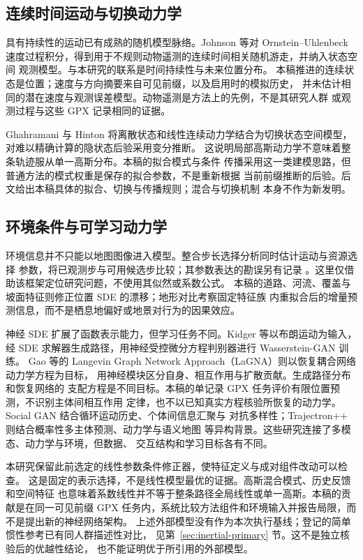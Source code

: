 \documentclass[UTF8,11pt]{ctexart}
\begin{document}
\subsection{连续时间运动与切换动力学}
具有持续性的运动已有成熟的随机模型脉络。Johnson 等对 Ornstein--Uhlenbeck
速度过程积分，得到用于不规则动物遥测的连续时间相关随机游走，并纳入状态空间
观测模型\cite{johnson2008}。与本研究的联系是时间持续性与未来位置分布。
本稿推进的连续状态是位置；速度与方向摘要来自可见前缀，以及启用时的模拟历史，
并未估计相同的潜在速度与观测误差模型。动物遥测是方法上的先例，不是其研究人群
或观测过程与这些 GPX 记录相同的证据。

Ghahramani 与 Hinton 将离散状态和线性连续动力学结合为切换状态空间模型，
对难以精确计算的隐状态后验采用变分推断\cite{ghahramani2000}。
这说明局部高斯动力学不意味着整条轨迹服从单一高斯分布。本稿的拟合模式与条件
传播采用这一类建模思路，但普通方法的模式权重是保存的拟合参数，不是重新根据
当前前缀推断的后验。后文给出本稿具体的拟合、切换与传播规则；混合与切换机制
本身不作为新发明。

\subsection{环境条件与可学习动力学}
环境信息并不只能以地图图像进入模型。整合步长选择分析同时估计运动与资源选择
参数，将已观测步与可用候选步比较\cite{avgar2016}；其参数表达的勘误另有记录
\cite{avgar2017correction}。这里仅借助该框架定位研究问题，不使用其似然或系数公式。
本稿的道路、河流、覆盖与坡面特征则修正位置 SDE 的漂移；地形对比考察固定特征族
内重拟合后的增量预测信息，而不是栖息地偏好或地景对行为的因果效应。

神经 SDE 扩展了函数表示能力，但学习任务不同。Kidger 等以布朗运动为输入，经 SDE
求解器生成路径，用神经受控微分方程判别器进行 Wasserstein-GAN 训练\cite{kidger2021}。
Gao 等的 Langevin Graph Network Approach（LaGNA）则以恢复耦合网络动力学方程为目标，
用神经模块区分自身、相互作用与扩散贡献\cite{gao2024}。生成路径分布和恢复网络的
支配方程是不同目标。本稿的单记录 GPX 任务评价有限位置预测，不识别主体间相互作用
定律，也不以已知真实方程核验所恢复的动力学。Social GAN 结合循环运动历史、个体间信息汇聚与
对抗多样性\cite{gupta2018}；Trajectron++ 则结合概率性多主体预测、动力学与语义地图
等异构背景\cite{salzmann2020}。这些研究连接了多模态、动力学与环境，但数据、
交互结构和学习目标各有不同。

本研究保留此前选定的线性参数条件修正器，使特征定义与成对组件改动可以检查。
这是固定的表示选择，不是线性模型最优的证据。高斯混合模式、历史反馈和空间特征
也意味着系数线性并不等于整条路径全局线性或单一高斯。本稿的贡献是在同一可见前缀
GPX 任务内，系统比较方法组件和环境输入并报告局限，而不是提出新的神经网络架构。
上述外部模型没有作为本次执行基线；登记的简单惯性参考已有同人群描述性对比，
见第~\ref{sec:inertial-primary} 节。这不是独立核验后的优越性结论，
也不能证明优于所引用的外部模型。
\end{document}
